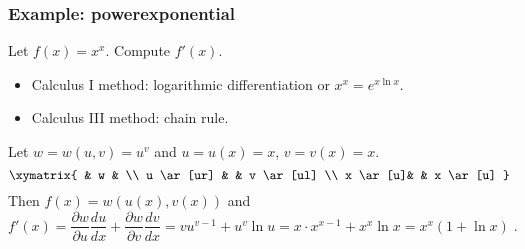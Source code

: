\begin{frame}
\frametitle{Example: powerexponential}

   Let $f(x) = x^x$. Compute $f'(x)$.

\begin{itemize}
\item Calculus I method: logarithmic differentiation or $x^x= e^{x\ln x}$.
\item Calculus III method: chain rule.
\end{itemize}

\pause
Let $w=w(u,v) = u^v$ and $u=u(x) = x$, $v=v(x) = x$.
%
$$
\xymatrix{
 & w  &  \\
u \ar[ur] & &  v \ar[ul] \\
x \ar[u]&  & x \ar[u]
}
$$
\pause
Then $f(x) = w(u(x),v(x))$ and
%
$$f'(x) = \frac{\partial w}{\partial u} \frac{du}{dx} + \frac{\partial w}{\partial v} \frac{dv}{dx} = vu^{v-1} + u^v\ln{u} = x\cdot x^{x-1} + x^x\ln{x} = x^x (1+\ln{x})\; .$$

\end{frame}